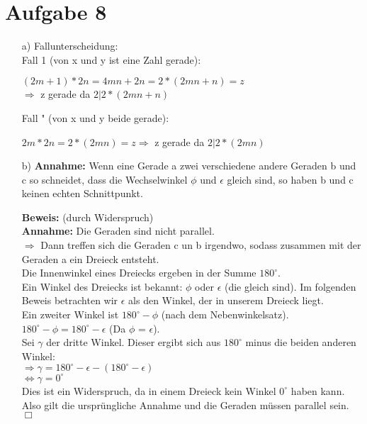 \documentclass[paper = a4, ngerman]{scrartcl}
\begin{document}
\section*{Aufgabe 8}
	\begin{itemize}
		\item[a)] Fallunterscheidung:\\
		Fall 1 (von x und y ist eine Zahl gerade):
		\begin{center}
			$(2m + 1) * 2n = 4mn + 2n = 2*(2mn + n) = z $\\$\Rightarrow$ z gerade da $2|2*(2mn + n)$
		\end{center}
		Fall " (von x und y beide gerade):
		\begin{center}
			$2m * 2n = 2*(2mn) = z \Rightarrow$ z gerade da $2|2*(2mn)$
		\end{center}
	
		\item[b)]
		\textbf{Annahme:} Wenn eine Gerade a zwei verschiedene andere Geraden b und c so schneidet, dass die Wechselwinkel
		$\phi$ und $\epsilon$ gleich sind, so haben b und c keinen echten Schnittpunkt.
		
		\textbf{Beweis:} (durch Widerspruch)\\
		\textbf{Annahme:} Die Geraden sind nicht parallel.\\
		
		$\Rightarrow$ Dann treffen sich die Geraden c un b irgendwo, sodass zusammen mit der Geraden a ein Dreieck entsteht.\\
		
		Die Innenwinkel eines Dreiecks ergeben in der Summe $180^\circ$.\\
		
		Ein Winkel des Dreiecks ist bekannt: $\phi$ oder $\epsilon$ (die gleich sind). Im folgenden Beweis betrachten wir $\epsilon$ als den Winkel, der in unserem Dreieck liegt.\\
		Ein zweiter Winkel ist $180^\circ - \phi$ (nach dem Nebenwinkelsatz).\\ $180^\circ - \phi = 180^\circ - \epsilon$ (Da $\phi$ = $\epsilon$).\\
		
		Sei $\gamma$ der dritte Winkel. Dieser ergibt sich aus $180^\circ$ minus die beiden anderen Winkel:\\
		$\Rightarrow \gamma = 180^\circ - \epsilon - (180^\circ - \epsilon) $ \\
		$\Leftrightarrow \gamma = 0^\circ$\\
		
		Dies ist ein Widerspruch, da in einem Dreieck kein Winkel $0^\circ$ haben kann. Also gilt die ursprüngliche Annahme und die Geraden müssen parallel sein.
		\hfil$\Box$
	\end{itemize}
\pagebreak
\end{document}

